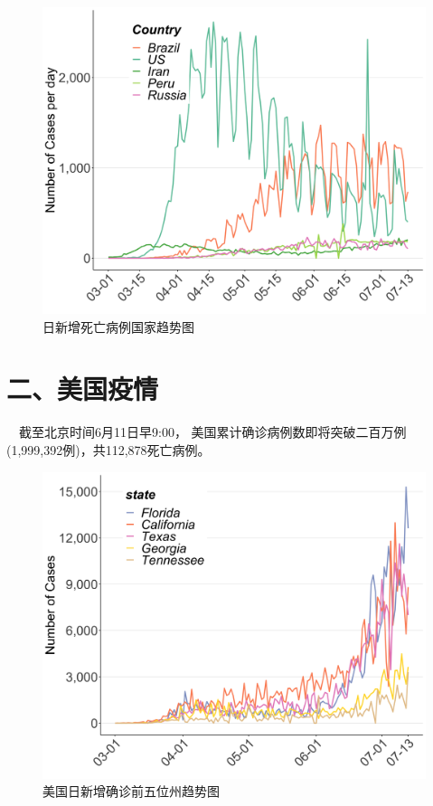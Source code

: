 \documentclass[
]{article}
\begin{document}
\begin{figure}[H]
\centering
{}
\caption{日新增死亡病例国家趋势图}
\includegraphics[]{./input/covid3.png}
\end{figure}

\vspace{-7mm}

\hypertarget{section-3}{%
\section{\texorpdfstring{\textcolor{glaucous}{\Huge 二、美国疫情}}{}}\label{section-3}}

\vspace{-5mm}

\(\quad\)截至北京时间6月11日早9:00，
美国累计确诊病例数即将突破二百万例(1,999,392例)，共112,878死亡病例。

\begin{figure}[H]
\centering
{}
\caption{美国日新增确诊前五位州趋势图}
\includegraphics[]{./input/covid5.png}
\end{figure}
\end{document}
